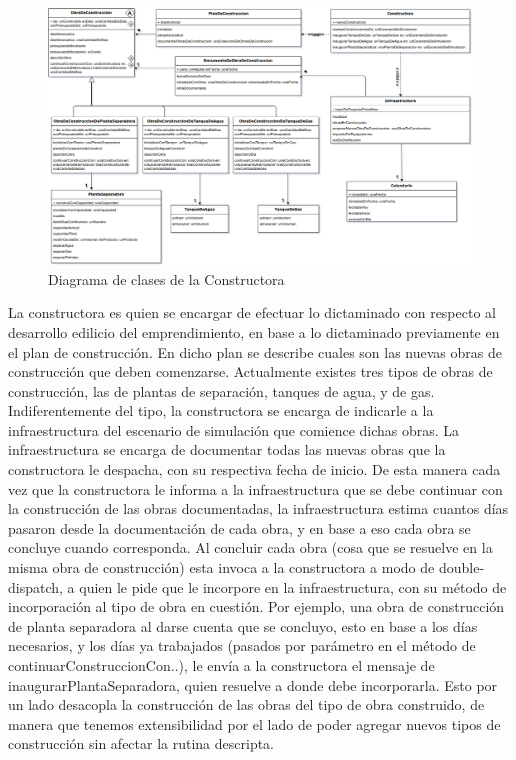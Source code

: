 \documentclass[10pt,a4paper]{article}
\begin{document}
\begin{figure}[H]
\centerline{\includegraphics[scale=0.40]{images/DiagramaDeClases_deConstructora.png}}
\caption{Diagrama de clases de la Constructora}
\end{figure}

La constructora es quien se encargar de efectuar lo dictaminado con respecto al desarrollo edilicio del emprendimiento, en base a lo dictaminado previamente en el plan de construcción. En dicho plan se describe cuales son las nuevas obras de construcción que deben comenzarse. Actualmente existes tres tipos de obras de construcción, las de plantas de separación, tanques de agua, y de gas. Indiferentemente del tipo, la constructora se encarga de indicarle a la infraestructura del escenario de simulación que comience dichas obras. La infraestructura se encarga de documentar todas las nuevas obras que la constructora le despacha, con su respectiva fecha de inicio. De esta manera cada vez que la constructora le informa a la infraestructura que se debe continuar con la construcción de las obras documentadas, la infraestructura estima cuantos días pasaron desde la documentación de cada obra, y en base a eso cada obra se concluye cuando corresponda. Al concluir cada obra (cosa que se resuelve en la misma obra de construcción) esta invoca a la constructora a modo de double-dispatch, a quien le pide que le incorpore en la infraestructura, con su método de incorporación al tipo de obra en cuestión. Por ejemplo, una obra de construcción de planta separadora al darse cuenta que se concluyo, esto en base a los días necesarios, y los días ya trabajados (pasados por parámetro en el método de continuarConstruccionCon..), le envía a la constructora el mensaje de inaugurarPlantaSeparadora, quien resuelve a donde debe incorporarla. Esto por un lado desacopla la construcción de las obras del tipo de obra construido, de manera que tenemos extensibilidad por el lado de poder agregar nuevos tipos de construcción sin afectar la rutina descripta. 
  
\end{document}

